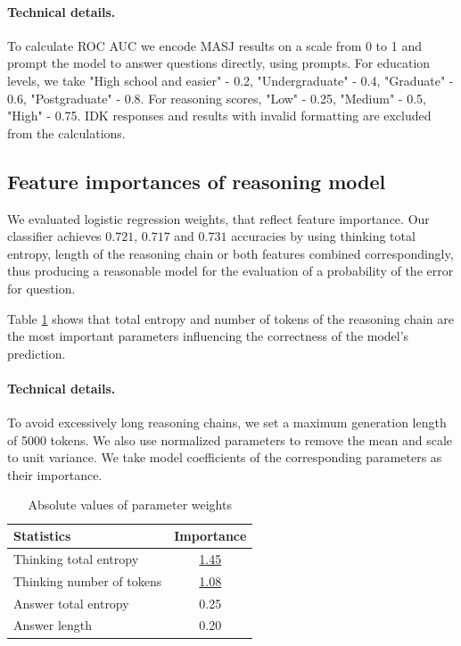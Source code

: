 \paragraph{Technical details.}
To calculate ROC AUC we encode MASJ results on a scale from 0 to 1 and prompt the model to answer questions directly, using prompts. For education levels, we take "High school and easier" - 0.2, "Undergraduate" - 0.4, "Graduate" - 0.6, "Postgraduate" - 0.8. For reasoning scores, "Low" - 0.25, "Medium" - 0.5, "High" - 0.75.
IDK responses and results with invalid formatting are excluded from the calculations.


\subsection{Feature importances of reasoning model}
\label{sec:reasoner_feat_imp}

We evaluated logistic regression weights, that reflect feature importance. Our classifier achieves $0.721$, $0.717$ and $0.731$ accuracies by using thinking total entropy, length of the reasoning chain or both features combined correspondingly, thus producing a reasonable model for the evaluation of a probability of the error for question.

Table \ref{tab:param_importances} shows that total entropy and number of tokens of the reasoning chain are the most important parameters influencing the correctness of the model's prediction. 

\paragraph{Technical details.}

To avoid excessively long reasoning chains, we set a maximum generation length of 5000 tokens. We also use normalized parameters to remove the mean and scale to unit variance. We take model coefficients of the corresponding parameters as their importance. 

\begin{table}[t]
\centering
\begin{tabular}{l c}
\hline
Statistics & Importance \\
\hline
Thinking total entropy & \underline{1.45}\\
Thinking number of tokens & \underline{1.08}\\
Answer total entropy & 0.25\\
Answer length & 0.20\\
\hline
\end{tabular}
\caption{Absolute values of parameter weights}
\label{tab:param_importances}
\end{table}

